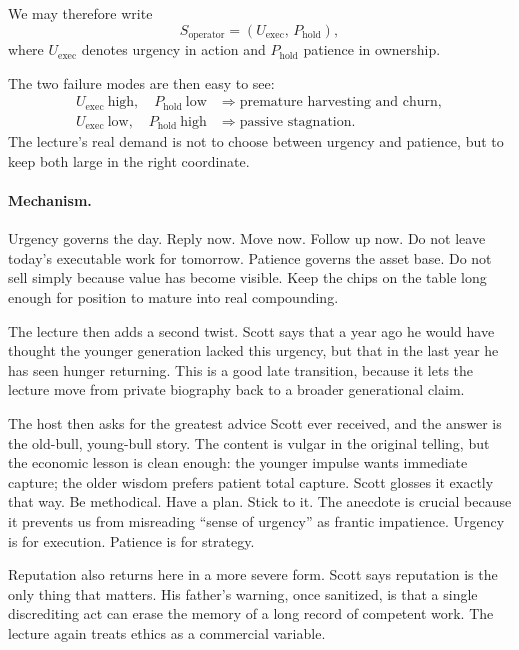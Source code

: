 We may therefore write
\begin{equation}
S_{\mathrm{operator}} = \left(U_{\mathrm{exec}},\,P_{\mathrm{hold}}\right),
\end{equation}
where \(U_{\mathrm{exec}}\) denotes urgency in action and \(P_{\mathrm{hold}}\) patience in ownership.

The two failure modes are then easy to see:
\begin{align}
U_{\mathrm{exec}} \ \text{high},\quad P_{\mathrm{hold}} \ \text{low}
&\Rightarrow \text{premature harvesting and churn},\\
U_{\mathrm{exec}} \ \text{low},\quad P_{\mathrm{hold}} \ \text{high}
&\Rightarrow \text{passive stagnation}.
\end{align}
The lecture's real demand is not to choose between urgency and patience, but to keep both large in the right coordinate.

\paragraph{Mechanism.}
Urgency governs the day. Reply now. Move now. Follow up now. Do not leave today's executable work for tomorrow. Patience governs the asset base. Do not sell simply because value has become visible. Keep the chips on the table long enough for position to mature into real compounding.

The lecture then adds a second twist. Scott says that a year ago he would have thought the younger generation lacked this urgency, but that in the last year he has seen hunger returning. This is a good late transition, because it lets the lecture move from private biography back to a broader generational claim.

The host then asks for the greatest advice Scott ever received, and the answer is the old-bull, young-bull story. The content is vulgar in the original telling, but the economic lesson is clean enough: the younger impulse wants immediate capture; the older wisdom prefers patient total capture. Scott glosses it exactly that way. Be methodical. Have a plan. Stick to it. The anecdote is crucial because it prevents us from misreading ``sense of urgency'' as frantic impatience. Urgency is for execution. Patience is for strategy.

Reputation also returns here in a more severe form. Scott says reputation is the only thing that matters. His father's warning, once sanitized, is that a single discrediting act can erase the memory of a long record of competent work. The lecture again treats ethics as a commercial variable.

